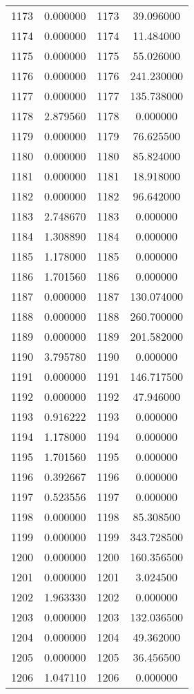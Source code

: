 \documentclass[12pt]{article}
\begin{document}
\begin{longtable}{@{}cccc@{}}
1173 & 0.000000 & 1173 & 39.096000 \\
1174 & 0.000000 & 1174 & 11.484000 \\
1175 & 0.000000 & 1175 & 55.026000 \\
1176 & 0.000000 & 1176 & 241.230000 \\
1177 & 0.000000 & 1177 & 135.738000 \\
1178 & 2.879560 & 1178 & 0.000000 \\
1179 & 0.000000 & 1179 & 76.625500 \\
1180 & 0.000000 & 1180 & 85.824000 \\
1181 & 0.000000 & 1181 & 18.918000 \\
1182 & 0.000000 & 1182 & 96.642000 \\
1183 & 2.748670 & 1183 & 0.000000 \\
1184 & 1.308890 & 1184 & 0.000000 \\
1185 & 1.178000 & 1185 & 0.000000 \\
1186 & 1.701560 & 1186 & 0.000000 \\
1187 & 0.000000 & 1187 & 130.074000 \\
1188 & 0.000000 & 1188 & 260.700000 \\
1189 & 0.000000 & 1189 & 201.582000 \\
1190 & 3.795780 & 1190 & 0.000000 \\
1191 & 0.000000 & 1191 & 146.717500 \\
1192 & 0.000000 & 1192 & 47.946000 \\
1193 & 0.916222 & 1193 & 0.000000 \\
1194 & 1.178000 & 1194 & 0.000000 \\
1195 & 1.701560 & 1195 & 0.000000 \\
1196 & 0.392667 & 1196 & 0.000000 \\
1197 & 0.523556 & 1197 & 0.000000 \\
1198 & 0.000000 & 1198 & 85.308500 \\
1199 & 0.000000 & 1199 & 343.728500 \\
1200 & 0.000000 & 1200 & 160.356500 \\
1201 & 0.000000 & 1201 & 3.024500 \\
1202 & 1.963330 & 1202 & 0.000000 \\
1203 & 0.000000 & 1203 & 132.036500 \\
1204 & 0.000000 & 1204 & 49.362000 \\
1205 & 0.000000 & 1205 & 36.456500 \\
1206 & 1.047110 & 1206 & 0.000000 \\

\end{longtable}
\end{document}

